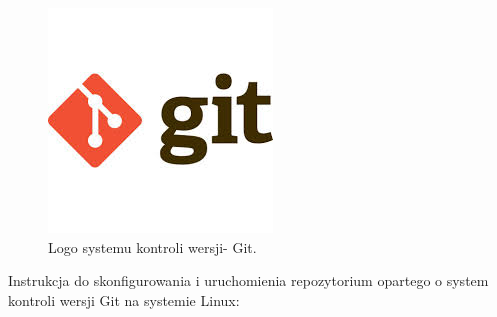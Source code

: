\documentclass[a4paper,12pt]{article}		%
\begin{document}
\begin{figure}[h!]
\centering
\includegraphics[scale=0.4]{Resources/Git_Logo.jpg}
\caption{Logo systemu kontroli wersji- Git.} 
\end{figure} 

Instrukcja do skonfigurowania i uruchomienia repozytorium opartego o system kontroli wersji Git na systemie Linux:
\end{document}
